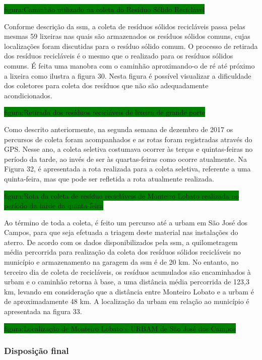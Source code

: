 	\colorbox{green}{figura:Caminhão utilizado na coleta do Resíduo Sólido Reciclável}	
		
	Conforme descrição da \gls{ssm}, a coleta de resíduos sólidos recicláveis passa pelas mesmas 59 lixeiras nas quais são armazenados os resíduos sólidos comuns, cujas localizações foram discutidas para o resíduo sólido comum.
	O processo de retirada dos resíduos recicláveis é o mesmo que o realizado para os resíduos sólidos comuns. É feita uma manobra com o caminhão aproximando-o de ré até próximo a lixeira como ilustra a figura 30. Nesta figura é possível visualizar a dificuldade dos coletores para coleta dos resíduos que não são adequadamente acondicionados.
	
	\colorbox{green}{figura:Retirada dos resíduos recicláveis de lixeira de grande porte}
	
	Como descrito anteriormente, na segunda semana de dezembro de 2017 os percursos de coleta foram acompanhados e as rotas foram registradas através do GPS. Nesse ano, a coleta seletiva costumava ocorrer às terças e quintas-feiras no período da tarde, ao invés de ser às quartas-feiras como ocorre atualmente. Na Figura 32, é apresentada a rota realizada para a coleta seletiva, referente a uma quinta-feira, mas que pode ser refletida a rota atualmente realizada.
	
	\colorbox{green}{figura:Rota da coleta de resíduo recicláveis de Monteiro Lobato realizada no período da tarde da quinta-feira}
	
	Ao término de toda a coleta, é feito um percurso até a \gls{urbam} em São José dos Campos, para que seja efetuada a triagem deste material nas instalações do aterro. De acordo com os dados disponibilizados pela \gls{ssm}, a quilometragem média percorrida para realização da coleta dos resíduos sólidos recicláveis no município e armazenamento na garagem da \gls{ssm} é de 20 km. No entanto, no terceiro dia de coleta de recicláveis, os resíduos acumulados são encaminhados à \gls{urbam} e o caminhão retorna à base, a uma distância média percorrida de 123,3 km, levando em consideração que a distância entre Monteiro Lobato e a \gls{urbam} é de aproximadamente 48 km. A localização da \gls{urbam} em relação ao município é apresentada na figura 33.
	
	\colorbox{green}{figura:Localização de Monteiro Lobato e URBAM de São José dos Campos}
	
	\subsubsection{Disposição final}
	
